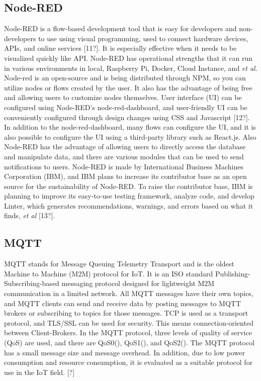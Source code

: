 \documentclass[conference]{IEEEtran}
\begin{document}
\subsection{Node-RED}
 
 Node-RED is a flow-based development tool that is easy for developers and non-developers to use using visual programming, used to connect hardware devices, APIs, and online services [11?]. It is especially effective when it needs to be visualized quickly like API. Node-RED has operational strengths that it can run in various environments in local, Raspberry Pi, Docker, Cloud Instance, and \textit{et al}. Node-red is an open-source and is being distributed through NPM, so you can utilize nodes or flows created by the user. It also has the advantage of being free and allowing users to customize nodes themselves. User interface (UI) can be configured using Node-RED's node-red-dashboard, and user-friendly UI can be conveniently configured through design changes using CSS and Javascript [12?]. In addition to the node-red-dashboard, many flows can configure the UI, and it is also possible to configure the UI using a third-party library such as React.js. Also Node-RED has the advantage of allowing users to directly access the database and manipulate data, and there are various modules that can be used to send notifications to users. Node-RED is made by International Business Machines Corporation (IBM), and IBM plans to increase its contributor base as an open source for the sustainability of Node-RED. To raise the contributor base, IBM is planning to improve its easy-to-use testing framework, analyze code, and develop Linter, which generates recommendations, warnings, and errors based on what it finds, \textit{et al} [13?].

\subsection{MQTT}
MQTT stands for Message Queuing Telemetry Transport and is the oldest Machine to Machine (M2M) protocol for IoT. It is an ISO standard Publishing-Subscribing-based messaging protocol designed for lightweight M2M communication in a limited network. All MQTT messages have their own topics, and MQTT clients can send and receive data by posting messages to MQTT brokers or subscribing to topics for those messages. TCP is used as a transport protocol, and TLS/SSL can be used for security. This means connection-oriented between Client-Brokers. In the MQTT protocol, three levels of quality of service (QoS) are used, and there are QoS0(), QoS1(), and QoS2(). The MQTT protocol has a small message size and message overhead. In addition, due to low power consumption and resource consumption, it is evaluated as a suitable protocol for use in the IoT field.
[?]
\end{document}
